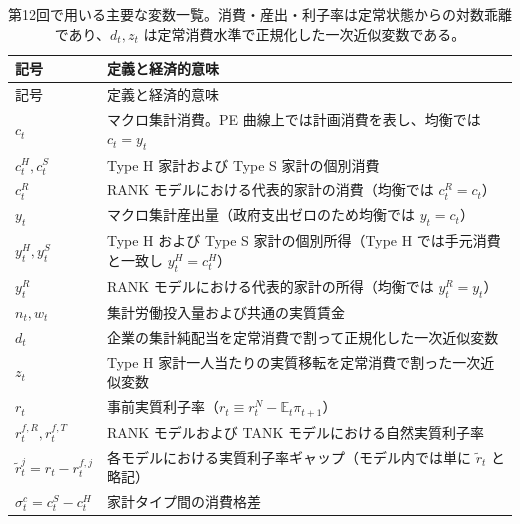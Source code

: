 \documentclass[
  japanese,
  lualatex,
  ja=standard,
  12pt,
  a4paper]{ltjsarticle}
\begin{document}
\begin{longtable}[]{@{}
  >{\raggedright\arraybackslash}p{}
  >{\raggedright\arraybackslash}p{}@{}}
\caption{第12回で用いる主要な変数一覧。消費・産出・利子率は定常状態からの対数乖離であり、\(d_t, z_t\)
は定常消費水準で正規化した一次近似変数である。}\label{tbl-lecture12-variables}\tabularnewline
\toprule\noalign{}
\begin{minipage}[b]{\linewidth}\raggedright
記号
\end{minipage} & \begin{minipage}[b]{\linewidth}\raggedright
定義と経済的意味
\end{minipage} \\
\midrule\noalign{}
\endfirsthead
\toprule\noalign{}
\begin{minipage}[b]{\linewidth}\raggedright
記号
\end{minipage} & \begin{minipage}[b]{\linewidth}\raggedright
定義と経済的意味
\end{minipage} \\
\midrule\noalign{}
\endhead
\bottomrule\noalign{}
\endlastfoot
\(c_t\) & マクロ集計消費。PE 曲線上では計画消費を表し、均衡では
\(c_t = y_t\) \\
\(c_t^H, c_t^S\) & Type H 家計および Type S 家計の個別消費 \\
\(c_t^R\) & RANK モデルにおける代表的家計の消費（均衡では
\(c_t^R = c_t\)） \\
\(y_t\) & マクロ集計産出量（政府支出ゼロのため均衡では
\(y_t = c_t\)） \\
\(y_t^H, y_t^S\) & Type H および Type S 家計の個別所得（Type H
では手元消費と一致し \(y_t^H = c_t^H\)） \\
\(y_t^R\) & RANK モデルにおける代表的家計の所得（均衡では
\(y_t^R = y_t\)） \\
\(n_t, w_t\) & 集計労働投入量および共通の実質賃金 \\
\(d_t\) & 企業の集計純配当を定常消費で割って正規化した一次近似変数 \\
\(z_t\) & Type H
家計一人当たりの実質移転を定常消費で割った一次近似変数 \\
\(r_t\) &
事前実質利子率（\(r_t \equiv r_t^N - \mathbb{E}_t \pi_{t+1}\)） \\
\(r_t^{f,R}, r_t^{f,T}\) & RANK モデルおよび TANK
モデルにおける自然実質利子率 \\
\(\widetilde{r}_t^j = r_t - r_t^{f,j}\) &
各モデルにおける実質利子率ギャップ（モデル内では単に \(\widetilde{r}_t\)
と略記） \\
\(\sigma_t^c = c_t^S - c_t^H\) & 家計タイプ間の消費格差 \\
\end{longtable}
\end{document}
